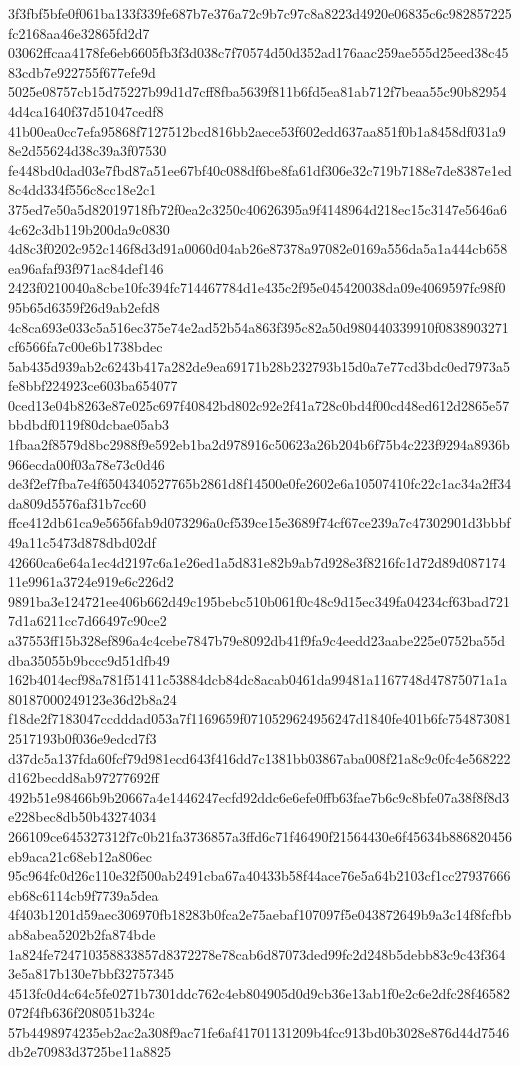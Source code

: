 {3f3fbf5bfe0f061ba133f339fe687b7e376a72c9b7c97c8a8223d4920e06835c6c982857225fc2168aa46e32865fd2d7
03062ffcaa4178fe6eb6605fb3f3d038c7f70574d50d352ad176aac259ae555d25eed38c4583cdb7e922755f677efe9d
5025e08757cb15d75227b99d1d7cff8fba5639f811b6fd5ea81ab712f7beaa55c90b829544d4ca1640f37d51047cedf8
41b00ea0cc7efa95868f7127512bcd816bb2aece53f602edd637aa851f0b1a8458df031a98e2d55624d38c39a3f07530
fe448bd0dad03e7fbd87a51ee67bf40c088df6be8fa61df306e32c719b7188e7de8387e1ed8c4dd334f556c8cc18e2c1
375ed7e50a5d82019718fb72f0ea2c3250c40626395a9f4148964d218ec15c3147e5646a64c62c3db119b200da9c0830
4d8c3f0202c952c146f8d3d91a0060d04ab26e87378a97082e0169a556da5a1a444cb658ea96afaf93f971ac84def146
2423f0210040a8cbe10fc394fc714467784d1e435c2f95e045420038da09e4069597fc98f095b65d6359f26d9ab2efd8
4c8ca693e033c5a516ec375e74e2ad52b54a863f395c82a50d980440339910f0838903271cf6566fa7c00e6b1738bdec
5ab435d939ab2c6243b417a282de9ea69171b28b232793b15d0a7e77cd3bdc0ed7973a5fe8bbf224923ce603ba654077
0ced13e04b8263e87e025c697f40842bd802c92e2f41a728c0bd4f00cd48ed612d2865e57bbdbdf0119f80dcbae05ab3
1fbaa2f8579d8bc2988f9e592eb1ba2d978916c50623a26b204b6f75b4c223f9294a8936b966ecda00f03a78e73c0d46
de3f2ef7fba7e4f6504340527765b2861d8f14500e0fe2602e6a10507410fc22c1ac34a2ff34da809d5576af31b7cc60
ffce412db61ca9e5656fab9d073296a0cf539ce15e3689f74cf67ce239a7c47302901d3bbbf49a11c5473d878dbd02df
42660ca6e64a1ec4d2197c6a1e26ed1a5d831e82b9ab7d928e3f8216fc1d72d89d08717411e9961a3724e919e6c226d2
9891ba3e124721ee406b662d49c195bebc510b061f0c48c9d15ec349fa04234cf63bad7217d1a6211cc7d66497c90ce2
a37553ff15b328ef896a4c4cebe7847b79e8092db41f9fa9c4eedd23aabe225e0752ba55ddba35055b9bccc9d51dfb49
162b4014ecf98a781f51411c53884dcb84dc8acab0461da99481a1167748d47875071a1a80187000249123e36d2b8a24
f18de2f7183047ccdddad053a7f1169659f0710529624956247d1840fe401b6fc7548730812517193b0f036e9edcd7f3
d37dc5a137fda60fcf79d981ecd643f416dd7c1381bb03867aba008f21a8c9c0fc4e568222d162becdd8ab97277692ff
492b51e98466b9b20667a4e1446247ecfd92ddc6e6efe0ffb63fae7b6c9c8bfe07a38f8f8d3e228bec8db50b43274034
266109ce645327312f7c0b21fa3736857a3ffd6c71f46490f21564430e6f45634b886820456eb9aca21c68eb12a806ec
95c964fc0d26c110e32f500ab2491cba67a40433b58f44ace76e5a64b2103cf1cc27937666eb68c6114cb9f7739a5dea
4f403b1201d59aec306970fb18283b0fca2e75aebaf107097f5e043872649b9a3c14f8fcfbbab8abea5202b2fa874bde
1a824fe724710358833857d8372278e78cab6d87073ded99fc2d248b5debb83c9c43f3643e5a817b130e7bbf32757345
4513fc0d4c64c5fe0271b7301ddc762c4eb804905d0d9cb36e13ab1f0e2c6e2dfc28f46582072f4fb636f208051b324c
57b4498974235eb2ac2a308f9ac71fe6af41701131209b4fcc913bd0b3028e876d44d7546db2e70983d3725be11a8825
}
